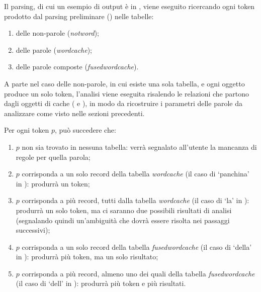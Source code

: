 \documentclass[twoside,stylearticle,11pt,filologia,it,article,bibsection]{spinoza}
\begin{document}
Il parsing, di cui un esempio di output è in ,
viene eseguito ricercando ogni token prodotto dal parsing preliminare
(\vedi {}) nelle tabelle:
\begin{enumerate}
\item delle non-parole ({\it notword});
\item delle parole ({\it wordcache});
\item delle parole composte ({\it fusedwordcache}).
\end{enumerate}

A parte nel caso delle non-parole, in cui esiste una sola tabella, e
ogni oggetto produce un solo token, l'analisi viene eseguita risalendo
le relazioni che partono dagli oggetti di cache (\vedi
{} e ), in modo da ricostruire
i parametri delle parole da analizzare come visto nelle sezioni
precedenti.

Per ogni token $p$, può succedere che:
\begin{enumerate}
\item $p$ non sia trovato in nessuna tabella: verrà segnalato
  all'utente la mancanza di regole per quella parola;
\item $p$ corrisponda a un solo record della tabella {\it wordcache}
  (il caso di `panchina' in ): produrrà un token;
\item $p$ corrisponda a più record, tutti dalla tabella {\it
  wordcache} (il caso di `la' in ): produrrà un
  solo token, ma ci saranno due possibili risultati di analisi
  (segnalando quindi un'ambiguità che dovrà essere risolta nei
  passaggi successivi);
\item $p$ corrisponda a un solo record della tabella {\it
  fusedwordcache} (il caso di `della' in ):
  produrrà più token, ma un solo risultato;
\item $p$ corrisponda a più record, almeno uno dei quali della tabella
  {\it fusedwordcache} (il caso di `dell\textquotesingle' in
  ): produrrà più token e più risultati.
\end{enumerate}
\end{document}
